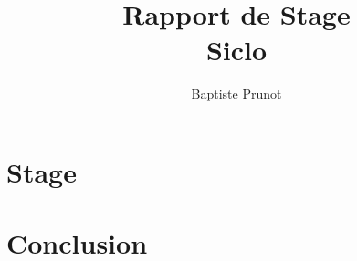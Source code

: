 \documentclass{report}
\author{Baptiste Prunot}
\title{Rapport de Stage\\Siclo}
\begin{document}
    \maketitle
    \tableofcontents
    \pagebreak
    
    \part{Stage}
    \part{Conclusion}
\end{document}
